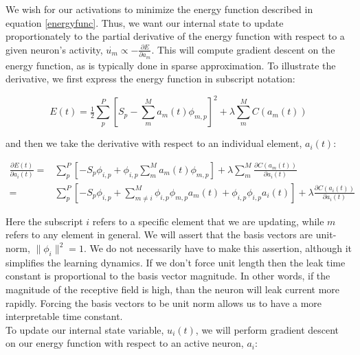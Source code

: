 \documentclass[smallextended]{svjour3}       %
\begin{document}
\noindent We wish for our activations to minimize the energy function described in equation \ref{energyfunc}. Thus, we want our internal state to update proportionately to the partial derivative of the energy function with respect to a given neuron's activity, $\dot{u_{m}} \propto -\frac{\partial E}{\partial a_{m}}$. This will compute gradient descent on the energy function, as is typically done in sparse approximation. To illustrate the derivative, we first express the energy function in subscript notation:

\begin{equation}
    E(t) = \tfrac{1}{2} \sum\limits_{p}^{P} \left[ S_{p} - \sum\limits_{m}^{M}a_{m}(t) \phi_{m,p} \right]^{2} +
           \lambda \sum\limits_{m}^{M} C(a_{m}(t))
\label{indexenergyfunc}
\end{equation}

\noindent and then we take the derivative with respect to an individual element, $a_{i}(t)$:

\begin{equation}
\begin{aligned}
    \frac{\partial E(t)}{\partial a_{i}(t)}
    =
        &\sum\limits_{p}^{P} \left[ -S_{p} \phi_{i,p} +
        \phi_{i,p}\sum\limits_{m}^{M}a_{m}(t) \phi_{m,p} \right] +
        \lambda \sum\limits_{m}^{M}\frac{\partial C(a_{m}(t))}{\partial a_{i}(t)} \\
    =
        &\sum\limits_{p}^{P} \left[ -S_{p} \phi_{i,p} +
        \sum\limits_{m \neq i}^{M} \phi_{i,p} \phi_{m,p} a_{m}(t) + \phi_{i,p}\phi_{i,p} a_{i}(t) \right] +
        \lambda \frac{\partial C(a_{i}(t))}{\partial a_{i}(t)}
\end{aligned}
\label{deda}
\end{equation}

\noindent Here the subscript $i$ refers to a specific element that we are updating, while $m$ refers to any element in general. We will assert that the basis vectors are unit-norm, $\parallel \phi_{i} \parallel^{2} = 1$. We do not necessarily have to make this assertion, although it simplifies the learning dynamics. If we don't force unit length then the leak time constant is proportional to the basis vector magnitude. In other words, if the magnitude of the receptive field is high, than the neuron will leak current more rapidly. Forcing the basis vectors to be unit norm allows us to have a more interpretable time constant.\\

\noindent To update our internal state variable, $u_{i}(t)$, we will perform gradient descent on our energy function with respect to an active neuron, $a_{i}$:
\end{document}
